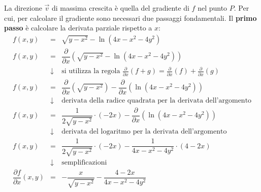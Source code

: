 \documentclass[a4paper]{article}
\begin{document}
	\noindent
	La direzione $\overrightarrow{v}$ di massima crescita è quella del gradiente di $f$ nel punto $P$. Per cui, per calcolare il gradiente sono necessari due passaggi fondamentali. Il \textbf{primo passo} è calcolare la derivata parziale rispetto a $x$:
	\begin{equation*}
		\begin{array}{rcl}
			f\left(x,y\right) &=& \sqrt{y-x^{2}}-\ln\left(4x-x^{2}-4y^{2}\right) \\ [1em]
			f\left(x,y\right) &=& \dfrac{\partial}{\partial x}\left( \sqrt{y-x^{2}}-\ln\left(4x-x^{2}-4y^{2}\right) \right) \\ [1.5em]
			&\downarrow& \text{si utilizza la regola } \frac{\partial}{\partial x}\left(f+g\right) = \frac{\partial}{\partial x}\left(f\right) + \frac{\partial}{\partial x}\left(g\right) \\ [1em]
			f\left(x,y\right) &=& \dfrac{\partial}{\partial x}\left( \sqrt{y-x^{2}}\right)- \dfrac{\partial}{\partial x}\left(\ln\left(4x-x^{2}-4y^{2}\right) \right) \\ [1.5em]
			&\downarrow& \text{derivata della radice quadrata per la derivata dell'argomento} \\ [1em]
			f\left(x,y\right) &=& \dfrac{1}{2\sqrt{y-x^{2}}}\cdot\left(-2x\right) - \dfrac{\partial}{\partial x}\left(\ln\left(4x-x^{2}-4y^{2}\right) \right) \\ [1.5em]
			&\downarrow& \text{derivata del logaritmo per la derivata dell'argomento} \\ [1em]
			f\left(x,y\right) &=& \dfrac{1}{2\sqrt{y-x^{2}}}\cdot\left(-2x\right) - \dfrac{1}{4x-x^{2}-4y^{2}} \cdot \left(4-2x\right) \\ [1.5em]
			&\downarrow& \text{semplificazioni} \\ [1em]
			\dfrac{\partial f}{\partial x}\left(x,y\right) &=& -\dfrac{x}{\sqrt{y-x^{2}}} - \dfrac{4-2x}{4x-x^{2}-4y^{2}} \\ [1.5em]
		\end{array}
	\end{equation*}\newpage
\end{document}
